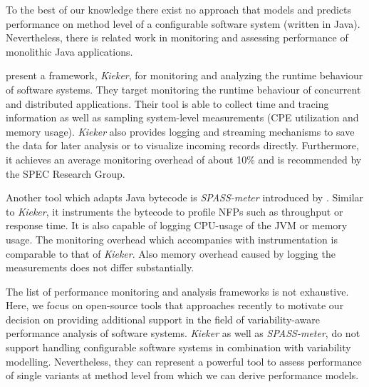 To the best of our knowledge there exist no approach that models and predicts performance on method level of a configurable software system (written in Java). Nevertheless, there is related work in monitoring and assessing performance of monolithic Java applications.

\cite{vanHoorn2012kieker} present a framework, \textit{Kieker}, for monitoring and analyzing the runtime behaviour of software systems. They target monitoring the runtime behaviour of concurrent and distributed applications. Their tool is able to collect time and tracing information as well as sampling system-level measurements (CPE utilization and memory usage). \textit{Kieker} also provides logging and streaming mechanisms to save the data for later analysis or to visualize incoming records directly. Furthermore, it achieves an average monitoring overhead of about 10\% and is recommended by the SPEC Research Group.

Another tool which adapts Java bytecode is \textit{SPASS-meter} introduced by \cite{eichelber12spassmeter}. Similar to \textit{Kieker}, it instruments the bytecode to profile \acp{NFP} such as throughput or response time. It is also capable of logging CPU-usage of the \ac{JVM} or memory usage. The monitoring overhead which accompanies with instrumentation is comparable to that of \textit{Kieker}. Also memory overhead caused by logging the measurements does not differ substantially. 

The list of performance monitoring and analysis frameworks is not exhaustive. Here, we focus on open-source tools that approaches recently to motivate our decision on providing additional support in the field of variability-aware performance analysis of software systems. \textit{Kieker} as well as \textit{SPASS-meter}, do not support handling configurable software systems in combination with variability modelling. Nevertheless, they can represent a powerful tool to assess performance of single variants at method level from which we can derive performance models.